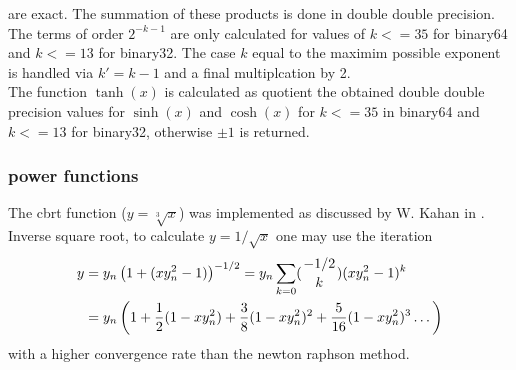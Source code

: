 \documentclass[10pt,a4paper,final,oneside]{article}
\numberwithin{equation}{subsection}
\begin{document}
are exact.
The summation of these products is done in
double double precision.
The terms of order $ 2^{-k-1} $ are only calculated for values of
$ k <= 35 $ for binary64 and $ k <= 13 $ for binary32.
The case $k$ equal to the maximim possible exponent is handled
via  $k' = k - 1$ and a final multiplcation by 2. \\[10pt]
The function $\tanh(x)$ is calculated as quotient the obtained double double
precision values for $\sinh(x)$ and $\cosh(x)$ for $ k<=35 $ in binary64 and
$k <=13$ for binary32, otherwise $\pm 1$ is returned.


%
%
\subsubsection{power functions}

The cbrt function ($ y=\sqrt[3]{x} $) was implemented as discussed by
W. Kahan in \cite{Kahan1991}.\\[10pt]
%
Inverse square root, to calculate $ y = 1/\sqrt{x} $ one may use the
iteration
\begin{equation}
    \begin{aligned}
        y &= y_n \left( 1+ ( x y_n^2 -1) \right)^{-1/2}
            = y_n \sum_{k=0} ({{-1/2}\atop{k}}) (x y_n^2 -1)^k \\
            & = y_n \left( 1 + \frac{1}{2} (1 - x y_n^2 ) +
            \frac{3}{8}(1- x y_n^2)^2 +
            \frac{5}{16} (1-x y_n^2)^3 \dots
            \right)
    \end{aligned}
\end{equation}
with a higher convergence rate than the newton raphson method.\\[10pt]
\end{document}
